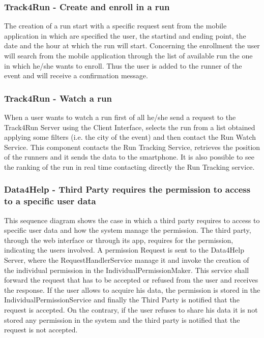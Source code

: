 \documentclass[a4paper]{article}
\begin{document}
\subsubsection{Track4Run - Create and enroll in a run}
The creation of a run start with a specific request sent from the mobile application in which are specified the user, the startind and ending point, the date and the hour at which the run will start.
Concerning the enrollment the user will search from the mobile application through the list of available run the one in which he/she wants to enroll. Thus the user is added to the runner of the event and will receive a confirmation message.

\subsubsection{Track4Run - Watch a run}
When a user wants to watch a run first of all he/she send a request to the Track4Run Server using the Client Interface, selects the run from a list obtained applying some filters (i.e. the city of the event) and then contact the Run Watch Service. This component contacts the Run Tracking Service, retrieves the position of the runners and it sends the data to the smartphone. It is also possible to see the ranking of the run in real time contacting directly the Run Tracking service.

\subsubsection{Data4Help - Third Party requires the permission to access to a specific user data}
This sequence diagram shows the case in which a third party requires to access to specific user data and how the system manage the permission.
The third party, through the web interface or through its app, requires for the permission, indicating the users involved. A permission Request is sent to the Data4Help Server, where the RequestHandlerService manage it and invoke the creation of the individual permission in the IndividualPermissionMaker. This service shall forward the request that has to be accepted or refused from the user and receives the response. If the user allows to acquire his data, the permission is stored in the IndividualPermissionService and finally the Third Party is notified that the request is accepted.
On the contrary, if the user refuses to share his data it is not stored any permission in the system and the third party is notified that the request is not accepted.
\end{document}
